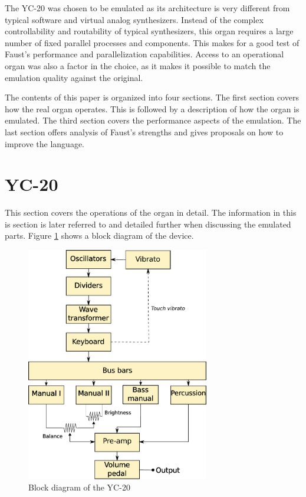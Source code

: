\documentclass[11pt,a4paper]{article}
\begin{document}
The YC-20 was chosen to be emulated as its architecture is very different from typical software and virtual analog synthesizers. Instead of the complex controllability and routability of typical synthesizers, this organ requires a large number of fixed parallel processes and components. This makes for a good test of Faust's performance and parallelization capabilities. Access to an operational organ was also a factor in the choice, as it makes it possible to match the emulation quality against the original. 

The contents of this paper is organized into four sections. The first section covers how the real organ operates. This is followed by a description of how the organ is emulated. The third section covers the performance aspects of the emulation. The last section offers analysis of Faust's strengths and gives proposals on how to improve the language.

\section{YC-20}
\label{section:yc-20}

This section covers the operations of the organ in detail\cite{yamaha:yc20}. The information in this is section is later referred to and detailed further when discussing the emulated parts. Figure \ref{fig:yc20block} shows a block diagram of the device.

\begin{figure}[tbp]
\centering
\includegraphics[width=80mm]{yc20-block.pdf}
\caption{Block diagram of the YC-20}
\label{fig:yc20block}
\end{figure}
\end{document}
